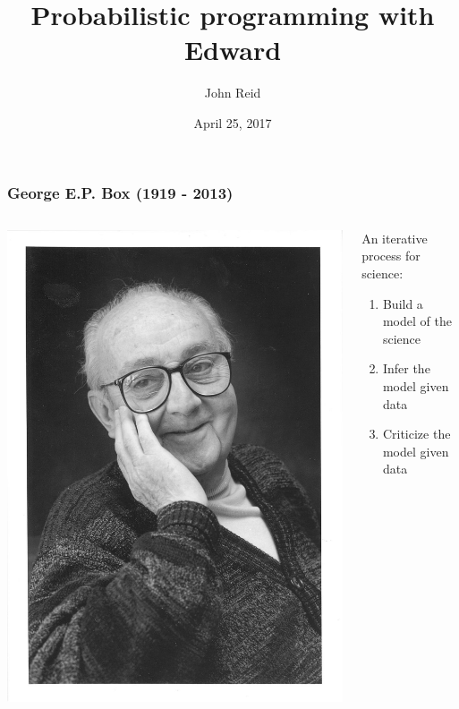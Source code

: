 \documentclass[10pt]{beamer}
\title{Probabilistic programming with Edward}
\date{April 25, 2017}
\author{John Reid}
\institute{Biostatistics Unit, \\ School of Clinical Medicine, \\ Cambridge University}
\begin{document}
\maketitle

\begin{frame}
\frametitle{George E.P. Box (1919 - 2013)}
\begin{columns}
\begin{column}{0.4\textwidth}
    \begin{center}
     \includegraphics[width=\columnwidth]{img/box.jpg}
     \end{center}
\end{column}
\begin{column}{0.6\textwidth}
An iterative process for science:
\\[1ex]
\begin{enumerate}
\item Build a model of the science
\\[1ex]
\item Infer the model given data
\\[1ex]
\item Criticize the model given data
\end{enumerate}
\end{column}
\end{columns}
\cite{box_useful_1962-1, box_experimental_1965-1, box_discrimination_1967-1, box_science_1976-1, box_sampling_1980-1}
\end{frame}
\end{document}
